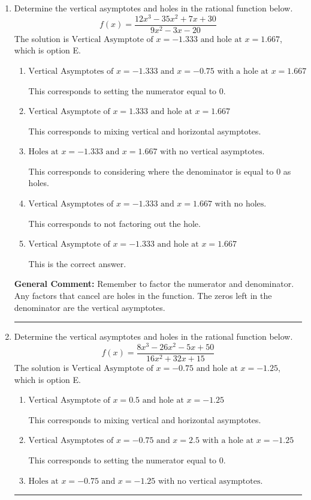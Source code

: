\documentclass{extbook}[14pt]
\newcommand{\litem}[1]{\item #1

\rule{\textwidth}{0.4pt}}
\begin{document}
\begin{enumerate}\litem{
Determine the vertical asymptotes and holes in the rational function below.
\[ f(x) = \frac{12x^{3} -35 x^{2} +7 x + 30}{9x^{2} -3 x -20} \]The solution is \( \text{Vertical Asymptote of } x = -1.333 \text{ and hole at } x = 1.667 \), which is option E.\begin{enumerate}[label=\Alph*.]
\item \( \text{Vertical Asymptotes of } x = -1.333 \text{ and } x = -0.75 \text{ with a hole at } x = 1.667 \)

This corresponds to setting the numerator equal to 0.
\item \( \text{Vertical Asymptote of } x = 1.333 \text{ and hole at } x = 1.667 \)

This corresponds to mixing vertical and horizontal asymptotes.
\item \( \text{Holes at } x = -1.333 \text{ and } x = 1.667 \text{ with no vertical asymptotes.} \)

This corresponds to considering where the denominator is equal to 0 as holes.
\item \( \text{Vertical Asymptotes of } x = -1.333 \text{ and } x = 1.667 \text{ with no holes.} \)

This corresponds to not factoring out the hole.
\item \( \text{Vertical Asymptote of } x = -1.333 \text{ and hole at } x = 1.667 \)

This is the correct answer.
\end{enumerate}

\textbf{General Comment:} Remember to factor the numerator and denominator. Any factors that cancel are holes in the function. The zeros left in the denominator are the vertical asymptotes.
}
\litem{
Determine the vertical asymptotes and holes in the rational function below.
\[ f(x) = \frac{8x^{3} -26 x^{2} -5 x + 50}{16x^{2} +32 x + 15} \]The solution is \( \text{Vertical Asymptote of } x = -0.75 \text{ and hole at } x = -1.25 \), which is option E.\begin{enumerate}[label=\Alph*.]
\item \( \text{Vertical Asymptote of } x = 0.5 \text{ and hole at } x = -1.25 \)

This corresponds to mixing vertical and horizontal asymptotes.
\item \( \text{Vertical Asymptotes of } x = -0.75 \text{ and } x = 2.5 \text{ with a hole at } x = -1.25 \)

This corresponds to setting the numerator equal to 0.
\item \( \text{Holes at } x = -0.75 \text{ and } x = -1.25 \text{ with no vertical asymptotes.} \)


\end{enumerate}}
\end{enumerate}
\end{document}
